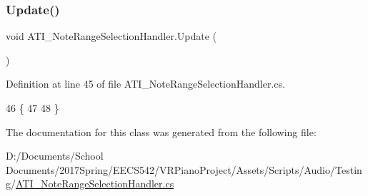 \subsubsection{\texorpdfstring{Update()}{Update()}}
{\footnotesize\ttfamily void A\+T\+I\+\_\+\+Note\+Range\+Selection\+Handler.\+Update (\begin{DoxyParamCaption}{ }\end{DoxyParamCaption})\hspace{0.3cm}{\ttfamily [private]}}



Definition at line 45 of file A\+T\+I\+\_\+\+Note\+Range\+Selection\+Handler.\+cs.


\begin{DoxyCode}
46     \{
47 
48     \}
\end{DoxyCode}


The documentation for this class was generated from the following file\+:\begin{DoxyCompactItemize}
\item 
D\+:/\+Documents/\+School Documents/2017\+Spring/\+E\+E\+C\+S542/\+V\+R\+Piano\+Project/\+Assets/\+Scripts/\+Audio/\+Testing/\hyperlink{_a_t_i___note_range_selection_handler_8cs}{A\+T\+I\+\_\+\+Note\+Range\+Selection\+Handler.\+cs}\end{DoxyCompactItemize}
